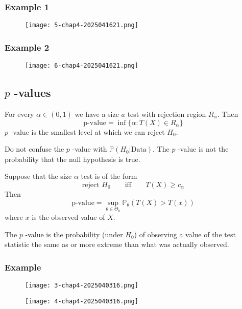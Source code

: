 \subsubsection{Example 1}

\begin{figure}[H]
\centering
\texttt{[image: 5-chap4-2025041621.png]}
\label{}
\end{figure}

\subsubsection{Example 2}

\begin{figure}[H]
\centering
\texttt{[image: 6-chap4-2025041621.png]}
\label{}
\end{figure}

\subsection{\texorpdfstring{$p$}{p} -values}

For every $\alpha\in(0,1)$ we have a size $a$ test with rejection region $R_{\alpha}$. Then
\[
\text{p-value}=\inf \{ \alpha:T(X)\in R_{\alpha} \}
\]
$p$ -value is the smallest level at which we can reject $H_0$.

\begin{remark}
Do not confuse the $p$ -value with $\mathbb{P}(H_0|\text{Data})$. The $p$ -value is not the probability that the null hypothesis is true.
\end{remark}
Suppose that the size $\alpha$ test is of the form
\[
\text{reject  }H_0\qquad \text{iff}\qquad T(X)\geq c_{\alpha}
\]
Then
\[
\text{p-value}=\sup_{\theta\in\Theta_0}\mathbb{P}_{\theta}(T(X)>T(x))
\]
where $x$ is the observed value of $X$.

\begin{note}
The $p$ -value is the probability (under $H_0$) of observing a value of the test statistic the same as or more extreme than what was actually observed.
\end{note}
\subsubsection{Example}

\begin{figure}[H]
\centering
\texttt{[image: 3-chap4-2025040316.png]}
\label{}
\end{figure}
\begin{figure}[H]
\centering
\texttt{[image: 4-chap4-2025040316.png]}
\label{}
\end{figure}

